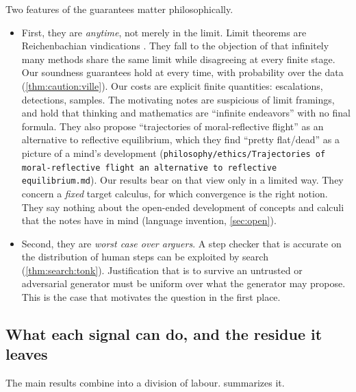 Two features of the guarantees matter philosophically.
\begin{itemize}
\item First, they are \emph{anytime}, not merely in the limit. Limit theorems are Reichenbachian vindications \citep{reichenbach1938experience}. They fall to the objection of \citet{salmon1967foundations} that infinitely many methods share the same limit while disagreeing at every finite stage. Our soundness guarantees hold at every time, with probability over the data (\cref{thm:caution:ville}). Our costs are explicit finite quantities: escalations, detections, samples. The motivating notes are suspicious of limit framings, and hold that thinking and mathematics are ``infinite endeavors'' with no final formula. They also propose ``trajectories of moral-reflective flight'' as an alternative to reflective equilibrium, which they find ``pretty flat/dead'' as a picture of a mind's development (\texttt{philosophy/ethics/Trajectories of moral-reflective flight \textemdash{} an alternative to reflective equilibrium.md}). Our results bear on that view only in a limited way. They concern a \emph{fixed} target calculus, for which convergence is the right notion. They say nothing about the open-ended development of concepts and calculi that the notes have in mind (language invention, \cref{sec:open}).
\item Second, they are \emph{worst case over arguers}. A step checker that is accurate on the distribution of human steps can be exploited by search (\cref{thm:search:tonk}). Justification that is to survive an untrusted or adversarial generator must be uniform over what the generator may propose. This is the case that motivates the question in the first place.
\end{itemize}

\subsection{What each signal can do, and the residue it leaves}\label{sec:philosophy:labour}

The main results combine into a division of labour.  summarizes it.

